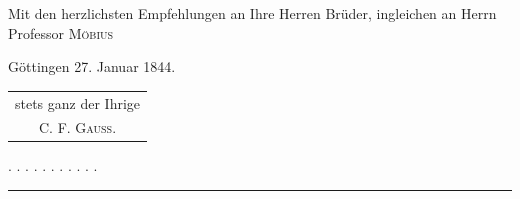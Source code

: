 Mit den herzlichsten Empfehlungen an Ihre Herren Brüder, ingleichen an Herrn Professor \textsc{Möbius}
\par\medskip
\noindent\hspace*{\parindent}Göttingen 27. Januar 1844.\hfill\begin{tabular}[t]{@{}c@{}}stets ganz der Ihrige\\C. F. \textsc{Gauss}.\end{tabular}\hspace*{\parindent}
\par\medskip\noindent\hspace*{\parindent}. . . . . . . . . . .
\par\begin{center}\rule{.25\linewidth}{.4pt}\end{center}
\clearpage\endgroup
